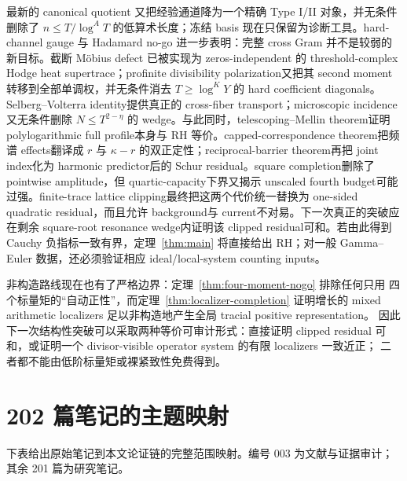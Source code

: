 \documentclass[UTF8,11pt,a4paper]{ctexart}
\theoremstyle{definition}
\theoremstyle{remark}
\newcommand{\1}{\mathbf 1}
\begin{document}
最新的 canonical quotient 又把经验通道降为一个精确 Type I/II 对象，并无条件删除了 $n\leq T/\log^A T$ 的低算术长度；冻结 basis 现在只保留为诊断工具。hard-channel gauge 与 Hadamard no-go 进一步表明：完整 cross Gram 并不是较弱的新目标。截断 M\"obius defect 已被实现为 zeros-independent 的 threshold-complex Hodge heat supertrace；profinite divisibility polarization又把其 second moment转移到全部单调权，并无条件消去 $T\geq\log^K Y$ 的 hard coefficient diagonals。Selberg--Volterra identity提供真正的 cross-fiber transport；microscopic incidence又无条件删除 $N\leq T^{2-\eta}$ 的 wedge。与此同时，telescoping--Mellin theorem证明 polylogarithmic full profile本身与 RH 等价。capped-correspondence theorem把频谱 effects翻译成 $r$ 与 $\kappa-r$ 的双正定性；reciprocal-barrier theorem再把 joint index化为 harmonic predictor后的 Schur residual。square completion删除了 pointwise amplitude，但 quartic-capacity下界又揭示 unscaled fourth budget可能过强。finite-trace lattice clipping最终把这两个代价统一替换为 one-sided quadratic residual，而且允许 background与 current不对易。下一次真正的突破应在剩余 square-root resonance wedge内证明该 clipped residual可和。若由此得到 Cauchy 负指标一致有界，定理~\ref{thm:main} 将直接给出 RH；对一般 Gamma--Euler 数据，还必须验证相应 ideal/local-system counting inputs。

非构造路线现在也有了严格边界：定理~\ref{thm:four-moment-nogo} 排除任何只用
四个标量矩的“自动正性”，而定理~\ref{thm:localizer-completion} 证明增长的 mixed
arithmetic localizers 足以非构造地产生全局 tracial positive representation。
因此下一次结构性突破可以采取两种等价可审计形式：直接证明 clipped residual
可和，或证明一个 divisor-visible operator system 的有限 localizers 一致近正；
二者都不能由低阶标量矩或裸紧致性免费得到。

\appendix
\section{202 篇笔记的主题映射}

下表给出原始笔记到本文论证链的完整范围映射。编号 003 为文献与证据审计；
其余 201 篇为研究笔记。
\end{document}
